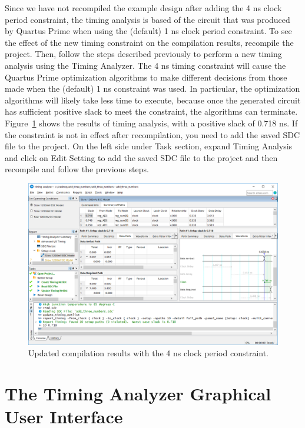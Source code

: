 \documentclass[11pt, twoside, pdftex]{article}
\begin{document}
Since we have not recompiled the example design after adding the 4 ns clock period
constraint, the timing analysis is based of the circuit that was produced by Quartus Prime
when using the (default) 1 ns clock period constraint. To see the effect of the new timing
constraint on the compilation results, recompile the project. Then, follow the steps described
previously to perform a new timing analysis using the Timing Analyzer. The 4 ns timing constraint
will cause the Quartus Prime optimization algorithms to make different decisions from those
made when the (default) 1 ns constraint was used. In particular, the optimization
algorithms will likely take less time to execute, because once the generated circuit has
sufficient positive slack to meet the constraint, the algorithms can terminate. 
Figure~\ref{fig:SB9} shows the results of timing analysis, with a positive slack of 0.718 ns. 
If the constraint is not in effect after recompilation, you need to add the saved SDC file to the project.
On the left side under Task section, expand Timing Analysis and click on Edit Setting to add the saved SDC file to the project and then recompile and follow the previous steps.

\begin{figure}[H]
\begin{center}
\includegraphics[scale=0.5]{figures/SB9.png}
\end{center}
\caption{Updated compilation results with the 4 ns clock period constraint.}
\label{fig:SB9}
\end{figure}

\section{The Timing Analyzer Graphical User Interface}
\label{sec:TQGUI}
\end{document}
